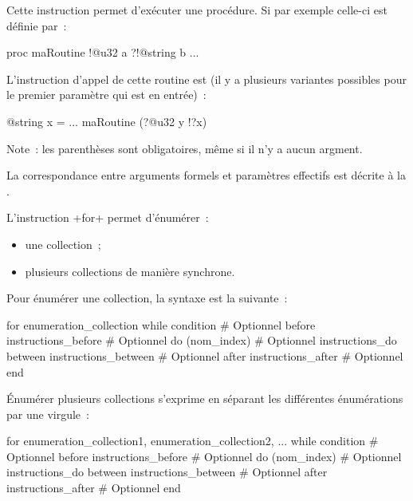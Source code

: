 

Cette instruction permet d'exécuter une procédure. Si par exemple celle-ci est définie par~:
\begin{galgas4}
proc maRoutine !@u32 a ?!@string b {
  ...
}
\end{galgas4}

L'instruction d'appel de cette routine est (il y a plusieurs variantes possibles pour le premier paramètre qui est en entrée)~:
\begin{galgas4}
@string x = ...
maRoutine (?@u32 y !?x)
\end{galgas4}

Note~: les parenthèses sont obligatoires, même si il n'y a aucun argment.

La correspondance entre arguments formels et paramètres effectifs est décrite à la .





L'instruction \ggsq+for+ permet d'énumérer~:
\begin{itemize}
  \item une collection~;
  \item plusieurs collections de manière synchrone.
\end{itemize}

Pour énumérer une collection, la syntaxe est la suivante~:

\begin{galgas4box}
for enumeration_collection
while condition # Optionnel
before instructions_before  # Optionnel
do
  (nom_index) # Optionnel
  instructions_do
between instructions_between  # Optionnel
after instructions_after  # Optionnel
end
\end{galgas4box}


Énumérer plusieurs collections s'exprime en séparant les différentes énumérations par une virgule~:
\begin{galgas4box}
for enumeration_collection1, enumeration_collection2, ...
while condition # Optionnel
before instructions_before  # Optionnel
do
  (nom_index) # Optionnel
  instructions_do
between instructions_between  # Optionnel
after instructions_after  # Optionnel
end
\end{galgas4box}


